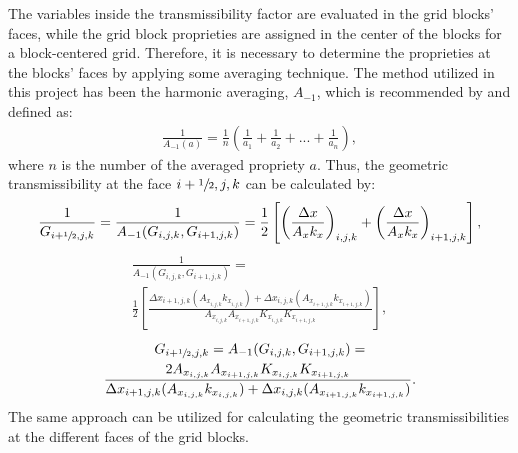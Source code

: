 %
The variables inside the transmissibility factor are evaluated in the grid blocks' faces, while the grid block proprieties are assigned in the center of the blocks for a block-centered grid.
%
Therefore, it is necessary to determine the proprieties at the blocks' faces by applying some averaging technique.
%
The method utilized in this project has been the harmonic averaging, $A_{-1}$, which is recommended by \cite{Ertekin2001} and defined as:
%
%
\begin{align}
	\frac{1}{A_{-1}(a)}=\frac{1}{n}\left(\frac{1}{a_1}+\frac{1}{a_2}+...+\frac{1}{a_n}\right),
\end{align}
%
where $n$ is the number of the averaged propriety $a$.
%
Thus, the geometric transmissibility at the face $i+\sfrac{1}{2},j,k$ can be calculated by:
%
\begin{align}
	\frac{1}{G_{i+\sfrac{1}{2},j,k}} = \frac{1}{A_{-1}(G_{i,j,k},G_{i+ 1,j,k})}=\frac{1}{2}\left[\left(\frac{\Delta x}{A_x k_x}\right)_{i,j,k}+\left(\frac{\Delta x}{A_x k_x}\right)_{i + 1,j,k}\right],
\end{align}
%
\begin{multline}
	\frac{1}{A_{-1}(G_{i,j,k},G_{i+ 1,j,k})}=\\\frac{1}{2}\left[\frac{
	\Delta x_{i + 1,j,k}(A_{x_{i,j,k}}k_{x_{i,j,k}})+\Delta x_{i,j,k}(A_{x_{i + 1,j,k}}k_{x_{i + 1,j,k}})}{A_{x_{i,j,k}}A_{x_{i + 1,j,k}}K_{x_{i,j,k}}K_{x_{i + 1,j,k}}}\right],
\end{multline}
%
\begin{multline}
	G_{i+ \sfrac{1}{2},j,k}=A_{-1}(G_{i,j,k},G_{i+ 1,j,k})=\\\frac{2 A_{x_{i,j,k}}A_{x_{i + 1,j,k}}K_{x_{i,j,k}}K_{x_{i + 1,j,k}}}{
	\Delta x_{i + 1,j,k}(A_{x_{i,j,k}}k_{x_{i,j,k}})+\Delta x_{i,j,k}(A_{x_{i + 1,j,k}}k_{x_{i + 1,j,k}})}.
\end{multline}
%
The same approach can be utilized for calculating the geometric transmissibilities at the different faces of the grid blocks. 

